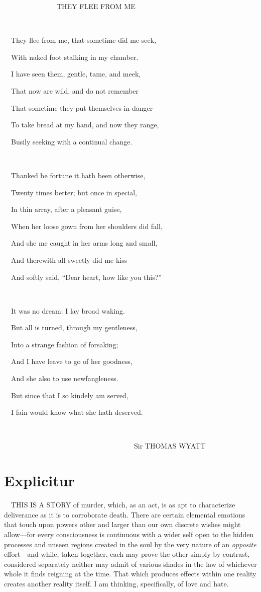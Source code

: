 \clearpage
~~~~~~~~~~~~~~~THEY FLEE FROM ME

~

~~They flee from me, that sometime did me seek,

~~With naked foot stalking in my chamber.

~~I have seen them, gentle, tame, and meek,

~~That now are wild, and do not remember

~~That sometime they put themselves in danger

~~To take bread at my hand, and now they range,

~~Busily seeking with a continual change.

~

~~Thanked be fortune it hath been otherwise,

~~Twenty times better; but once in special,

~~In thin array, after a pleasant guise,

~~When her loose gown from her shoulders did fall,

~~And she me caught in her arms long and small,

~~And therewith all sweetly did me kiss

~~And softly said, ``Dear heart, how like you this?''

~

~~It was no dream: I lay broad waking.

~~But all is turned, through my gentleness,

~~Into a strange fashion of forsaking;

~~And I have leave to go of her goodness,

~~And she also to use newfangleness.

~~But since that I so kindely am served,

~~I fain would know what she hath deserved.

~

~~~~~~~~~~~~~~~~~~~~~~~~~~~~~~~~~~~~~Sir THOMAS WYATT


\cleardoublepage

\chapter*{Explicitur}

~~THIS IS A STORY of murder, which, as an act, is as apt to characterize
deliverance as it is to corroborate death. There are certain elemental
emotions that touch upon powers other and larger than our own discrete
wishes might allow---for every consciousness is continuous with a wider
self open to the hidden processes and unseen regions created in the soul
by the very nature of an \emph{opposite} effort---and while, taken
together, each may prove the other simply by contrast, considered
separately neither may admit of various shades in the law of whichever
whole it finds reigning at the time. That which produces effects within
one reality creates another reality itself. I am thinking, specifically,
of love and hate.

